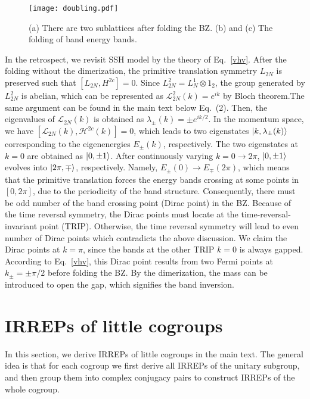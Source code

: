 \documentclass[aps,prl,twocolumn,noshowpacs,superscriptaddress]{revtex4-1}
\def \L {\mathcal{L}}
\def \H {\mathcal{H}}
\begin{document}
\begin{figure}[t]
	\centering
	\texttt{[image: doubling.pdf]}
	\caption{(a) There are two sublattices after folding the BZ. (b) and (c) The folding of band energy bands.\label{figs0}}
\end{figure}

In the retrospect, we revisit SSH model by the theory of Eq.~\eqref{vhv}. After the folding without the dimerization, the primitive translation symmetry $ L_{2N} $ is preserved such that $ [L_{2N},H^{2c}]=0 $. Since $ L_{2N}^2= L_N^1\otimes 1_2 $, the group generated by $ L_{2N}^2 $ is abelian, which can be represented as $ \L_{2N}^2(k)=e^{ik} $ by Bloch theorem.The same argument can be found in the main text below Eq.~(2). Then, the eigenvalues of $ \L_{2N}(k) $ is obtained as $ \lambda_{\pm}(k)= \pm e^{ik/2} $. In the momentum space, we have $ [\L_{2N}(k),\H^{2c}(k)]=0 $, which leads to two eigenstates $ \ket{k,\lambda_{\pm}(k)} $ corresponding to the eigenenergies $ E_{\pm}(k) $, respectively. The two eigenstates at $ k=0 $ are obtained as $ \ket{0,\pm1} $. After continuously varying $ k=0\rightarrow 2\pi $, $ \ket{0,\pm1} $ evolves into $ \ket{2\pi,\mp} $, respectively. Namely, $ E_{\pm}(0)\rightarrow E_{\mp}(2\pi)$, which means that the primitive translation forces the energy bands crossing at some points in $ [0,2\pi] $, due to the periodicity of the band structure. Consequently, there must be odd number of the band crossing point (Dirac point) in the BZ. Because of the time reversal symmetry, the Dirac points must locate at the time-reversal-invariant point (TRIP). Otherwise, the time reversal symmetry will lead to even number of Dirac points which contradicts the above discussion. We claim the Dirac points at $ k=\pi $, since the bands at the other TRIP $ k=0 $ is always gapped. According to Eq.~\eqref{vhv}, this Dirac point results from two Fermi points at $ k_{\pm}=\pm\pi/2 $ before folding the BZ. By the dimerization, the mass can be introduced to open the gap, which signifies the band inversion.






\section{IRREPs of little cogroups}
In this section, we derive IRREPs of little cogroups in the main text. The general idea is that for each cogroup we first derive all IRREPs of the unitary subgroup, and then group them into complex conjugacy pairs to construct IRREPs of the whole cogroup.
\end{document}
